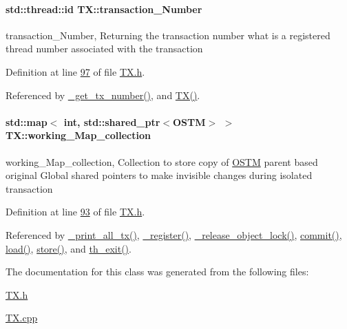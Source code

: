 \paragraph[{\texorpdfstring{transaction\+\_\+\+Number}{transaction_Number}}]{\setlength{\rightskip}{0pt plus 5cm}std\+::thread\+::id T\+X\+::transaction\+\_\+\+Number\hspace{0.3cm}{\ttfamily [private]}}\hypertarget{class_t_x_a145a1c74b521f277fe481971a930b249_a145a1c74b521f277fe481971a930b249}{}\label{class_t_x_a145a1c74b521f277fe481971a930b249_a145a1c74b521f277fe481971a930b249}
transaction\+\_\+\+Number, Returning the transaction number what is a registered thread number associated with the transaction 

Definition at line \hyperlink{_t_x_8h_source_l00097}{97} of file \hyperlink{_t_x_8h_source}{T\+X.\+h}.



Referenced by \hyperlink{_t_x_8cpp_source_l00294}{\+\_\+get\+\_\+tx\+\_\+number()}, and \hyperlink{_t_x_8cpp_source_l00036}{T\+X()}.

\paragraph[{\texorpdfstring{working\+\_\+\+Map\+\_\+collection}{working_Map_collection}}]{\setlength{\rightskip}{0pt plus 5cm}std\+::map$<$ int, std\+::shared\+\_\+ptr$<${\bf O\+S\+TM}$>$ $>$ T\+X\+::working\+\_\+\+Map\+\_\+collection\hspace{0.3cm}{\ttfamily [private]}}\hypertarget{class_t_x_a81aafda16e2f20e36ec6c68e584668ff_a81aafda16e2f20e36ec6c68e584668ff}{}\label{class_t_x_a81aafda16e2f20e36ec6c68e584668ff_a81aafda16e2f20e36ec6c68e584668ff}
working\+\_\+\+Map\+\_\+collection, Collection to store copy of \hyperlink{class_o_s_t_m}{O\+S\+TM} parent based original Global shared pointers to make invisible changes during isolated transaction 

Definition at line \hyperlink{_t_x_8h_source_l00093}{93} of file \hyperlink{_t_x_8h_source}{T\+X.\+h}.



Referenced by \hyperlink{_t_x_8cpp_source_l00311}{\+\_\+print\+\_\+all\+\_\+tx()}, \hyperlink{_t_x_8cpp_source_l00096}{\+\_\+register()}, \hyperlink{_t_x_8cpp_source_l00253}{\+\_\+release\+\_\+object\+\_\+lock()}, \hyperlink{_t_x_8cpp_source_l00177}{commit()}, \hyperlink{_t_x_8cpp_source_l00137}{load()}, \hyperlink{_t_x_8cpp_source_l00157}{store()}, and \hyperlink{_t_x_8cpp_source_l00052}{th\+\_\+exit()}.



The documentation for this class was generated from the following files\+:\begin{DoxyCompactItemize}
\item 
\hyperlink{_t_x_8h}{T\+X.\+h}\item 
\hyperlink{_t_x_8cpp}{T\+X.\+cpp}\end{DoxyCompactItemize}
